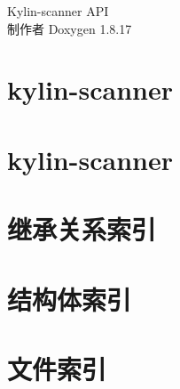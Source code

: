 \let\mypdfximage\pdfximage\def\pdfximage{\immediate\mypdfximage}\documentclass[twoside]{book}
\newcommand{\+}{\discretionary{\mbox{\scriptsize$\hookleftarrow$}}{}{}}
\newcommand{\clearemptydoublepage}{%
  \newpage{\pagestyle{empty}\cleardoublepage}%
}
\begin{document}
\begin{CJK}{UTF8}{min}

\hypersetup{pageanchor=false,
             bookmarksnumbered=true,
             pdfencoding=unicode
            }
\begin{titlepage}
\vspace*{7cm}
\begin{center}%
{\Large Kylin-\/scanner A\+PI }\\
\vspace*{1cm}
{\large 制作者 Doxygen 1.8.17}\\
\end{center}
\end{titlepage}
\clearemptydoublepage
{}
\tableofcontents
\clearemptydoublepage
{}
\hypersetup{pageanchor=true}

\chapter{kylin-\/scanner}
\label{md_README}

\chapter{kylin-\/scanner}
\label{md_README_CN}

\chapter{继承关系索引}

\chapter{结构体索引}

\chapter{文件索引}


\end{CJK}
\end{document}
